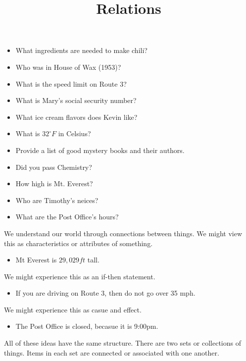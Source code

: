 \documentclass{ximera}
\title{Relations}
\begin{document}
\begin{abstract}
\end{abstract}
\maketitle

\begin{model}

\begin{itemize}
\item What ingredients are needed to make chili?
\item Who was in House of Wax (1953)?
\item What is the speed limit on Route 3?
\item What is Mary's social security number?
\item What ice cream flavors does Kevin like?
\item What is $32^\circ F$ in Celsius?
\item Provide a list of good mystery books and their authors.
\item Did you pass Chemistry?
\item How high is Mt. Everest?
\item Who are Timothy's neices?
\item What are the Post Office's hours?
\end{itemize}

We understand our world through connections between things. We might view this as characteristics or attributes of something.  \\
\begin{itemize}
\item Mt Everest is $29,029 ft$ tall.
\end{itemize}


We might experience this as an if-then statement.
\begin{itemize}
\item If you are driving on Route 3, then do not go over 35 mph.
\end{itemize}



We might experience this as casue and effect.
\begin{itemize}
\item The Post Office is closed, becasue it is 9:00pm.
\end{itemize}



All of these ideas have the same structure.  There are two sets or collections of things.  Items in each set are connected or associated with one another.




\end{model}
\end{document}
